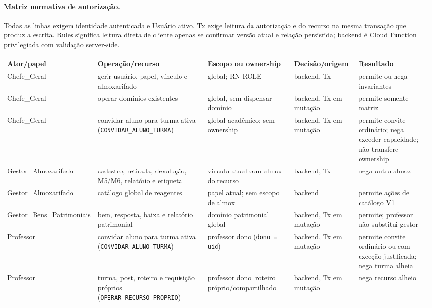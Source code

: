 \paragraph{Matriz normativa de autorização.}
Todas as linhas exigem identidade autenticada e Usuário ativo. Tx exige leitura
da autorização e do recurso na mesma transação que produz a escrita. Rules
significa leitura direta de cliente apenas se confirmar versão atual e relação
persistida; backend é Cloud Function privilegiada com validação server-side.

\scriptsize
\setlength{\tabcolsep}{2pt}
\begin{longtable}{>{\raggedright\arraybackslash}p{}>{\raggedright\arraybackslash}p{}>{\raggedright\arraybackslash}p{}>{\raggedright\arraybackslash}p{}>{\raggedright\arraybackslash}p{}}
\toprule
Ator/papel & Operação/recurso & Escopo ou ownership & Decisão/origem & Resultado \\
\midrule
Chefe\_Geral & gerir usuário, papel, vínculo e almoxarifado & global; RN-ROLE & backend, Tx & permite ou nega invariantes \\
Chefe\_Geral & operar domínios existentes & global, sem dispensar domínio & backend, Tx em mutação & permite somente matriz \\
Chefe\_Geral & convidar aluno para turma ativa (\texttt{CONVIDAR\_ALUNO\_TURMA}) & global acadêmico; sem ownership & backend, Tx em mutação & permite convite ordinário; nega exceder capacidade; não transfere ownership \\
Gestor\_Almoxarifado & cadastro, retirada, devolução, M5/M6, relatório e etiqueta & vínculo atual com almox do recurso & backend, Tx & nega outro almox \\
Gestor\_Almoxarifado & catálogo global de reagentes & papel atual; sem escopo de almox & backend & permite ações de catálogo V1 \\
Gestor\_Bens\_Patrimoniais & bem, resposta, baixa e relatório patrimonial & domínio patrimonial global & backend, Tx em mutação & permite; professor não substitui gestor \\
Professor & convidar aluno para turma ativa (\texttt{CONVIDAR\_ALUNO\_TURMA}) & professor dono (\texttt{dono = uid}) & backend, Tx em mutação & permite convite ordinário ou com exceção justificada; nega turma alheia \\
Professor & turma, post, roteiro e requisição próprios (\texttt{OPERAR\_RECURSO\_PROPRIO}) & professor dono; roteiro próprio/compartilhado & backend, Tx em mutação & nega recurso alheio \\

\end{longtable}
